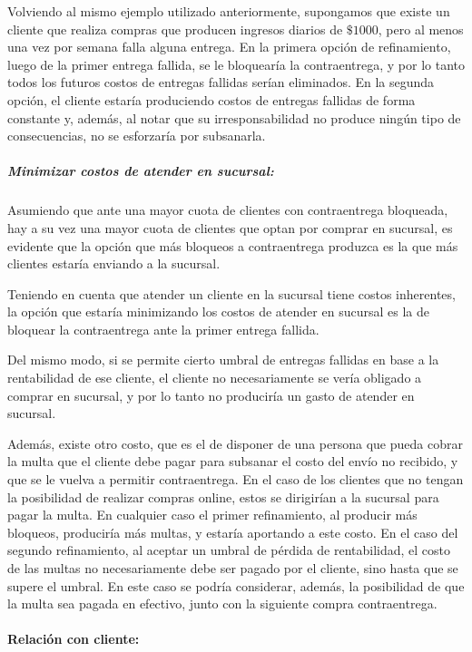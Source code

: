 Volviendo al mismo ejemplo utilizado anteriormente, supongamos que existe un
cliente que realiza compras que producen ingresos diarios de $\$1000$, pero al
menos una vez por semana falla alguna entrega. En la primera opción de
refinamiento, luego de la primer entrega fallida, se le bloquearía la
contraentrega, y por lo tanto todos los futuros costos de entregas fallidas
serían eliminados. En la segunda opción, el cliente estaría produciendo costos
de entregas fallidas de forma constante y, además, al notar que su
irresponsabilidad no produce ningún tipo de consecuencias, no se esforzaría
por subsanarla.

\subparagraph{Minimizar costos de atender en sucursal:}

Asumiendo que ante una mayor cuota de clientes con contraentrega bloqueada,
hay a su vez una mayor cuota de clientes que optan por comprar en sucursal, es
evidente que la opción que más bloqueos a contraentrega produzca es la que más
clientes estaría enviando a la sucursal.

Teniendo en cuenta que atender un cliente en la sucursal tiene costos
inherentes, la opción que estaría minimizando los costos de atender en
sucursal es la de bloquear la contraentrega ante la primer entrega fallida.

Del mismo modo, si se permite cierto umbral de entregas fallidas en base a la
rentabilidad de ese cliente, el cliente no necesariamente se vería obligado a
comprar en sucursal, y por lo tanto no produciría un gasto de atender en
sucursal.

Además, existe otro costo, que es el de disponer de una persona que pueda
cobrar la multa que el cliente debe pagar para subsanar el costo del envío no
recibido, y que se le vuelva a permitir contraentrega. En el caso de los
clientes que no tengan la posibilidad de realizar compras online, estos se
dirigirían a la sucursal para pagar la multa. En cualquier caso el primer
refinamiento, al producir más bloqueos, produciría más multas, y estaría
aportando a este costo. En el caso del segundo refinamiento, al aceptar un
umbral de pérdida de rentabilidad, el costo de las multas no necesariamente
debe ser pagado por el cliente, sino hasta que se supere el umbral. En este
caso se podría considerar, además, la posibilidad de que la multa sea pagada
en efectivo, junto con la siguiente compra contraentrega.

\paragraph{Relación con cliente:}

